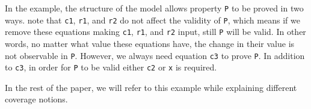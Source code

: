 In the example, the structure of the model allows property {\tt P} to be proved in two ways.
note that {\tt c1}, {\tt r1}, and {\tt r2} do not affect the validity of {\tt P}, which means
if we remove these equations making {\tt c1}, {\tt r1}, and {\tt r2} input, still {\tt P} will be valid. 
In other words, no matter what value these equations have, the change in their value is not observable in {\tt P}.
However, we always need equation {\tt c3} to prove {\tt P}. In addition to {\tt c3}, in order for {\tt P} to be valid either {\tt c2} or {\tt x} is required.

In the rest of the paper, we will refer to this example while explaining different coverage notions.



